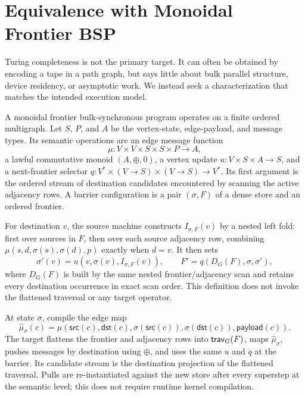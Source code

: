 \section{Equivalence with Monoidal Frontier BSP}

Turing completeness is not the primary target.  It can often be obtained by
encoding a tape in a path graph, but says little about bulk parallel structure,
device residency, or asymptotic work.  We instead seek a characterization that
matches the intended execution model.

\begin{definition}
A monoidal frontier bulk-synchronous program operates on a finite ordered
multigraph.  Let $S$, $P$, and $A$ be the vertex-state, edge-payload, and
message types.  Its semantic operations are an edge message function
\[
 \mu:V\times V\times S\times S\times P\to A,
\]
a lawful commutative monoid $(A,\oplus,0)$, a vertex update
$u:V\times S\times A\to S$, and a next-frontier selector
$q:V^*\times(V\to S)\times(V\to S)\to V^*$.  Its first argument is the
ordered stream of destination candidates encountered by scanning the active
adjacency rows.  A barrier configuration is a pair $(\sigma,F)$ of a dense
store and an ordered frontier.
\end{definition}

For destination $v$, the source machine constructs $I_{\sigma,F}(v)$ by a
nested left fold: first over sources in $F$, then over each source adjacency
row, combining $\mu(s,d,\sigma(s),\sigma(d),p)$ exactly when $d=v$.  It then
sets
\[
 \sigma'(v)=u(v,\sigma(v),I_{\sigma,F}(v)),\qquad
 F'=q(D_G(F),\sigma,\sigma'),
\]
where $D_G(F)$ is built by the same nested frontier/adjacency scan and retains
every destination occurrence in exact scan order.
This definition does not invoke the flattened traversal or any target
operator.

\begin{definition}
At state $\sigma$, compile the edge map
\[
 \widehat\mu_\sigma(c)=
 \mu(\mathsf{src}(c),\mathsf{dst}(c),
     \sigma(\mathsf{src}(c)),\sigma(\mathsf{dst}(c)),
     \mathsf{payload}(c)).
\]
The target flattens the frontier and adjacency rows into $\mathsf{trav}_G(F)$, maps
$\widehat\mu_\sigma$, pushes messages by destination using $\oplus$, and uses
the same $u$ and $q$ at the barrier.  Its candidate stream is the destination
projection of the flattened traversal.  Pulls are re-instantiated against the new
store after every superstep at the semantic level; this does not require
runtime kernel compilation.
\end{definition}

